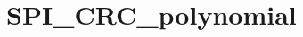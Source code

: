 \hypertarget{group___s_p_i___c_r_c__polynomial}{\section{S\-P\-I\-\_\-\-C\-R\-C\-\_\-polynomial}
\label{group___s_p_i___c_r_c__polynomial}
}
